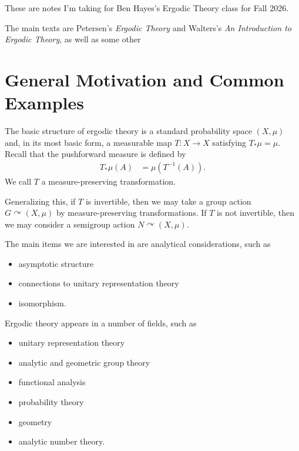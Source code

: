 \documentclass[10pt]{mypackage}
\begin{document}
\RaggedRight
These are notes I'm taking for Ben Hayes's Ergodic Theory class for Fall 2026.

The main texts are Petersen's \textit{Ergodic Theory} and Walters's \textit{An Introduction to Ergodic Theory}, as well as some other 
\section{General Motivation and Common Examples}%
The basic structure of ergodic theory is a standard probability space $\left( X,\mu \right)$ and, in its most basic form, a measurable map $T\colon X\rightarrow X$ satisfying $T_{\ast}\mu = \mu$. Recall that the pushforward measure is defined by
\begin{align*}
  T_{\ast}\mu\left( A \right) &= \mu\left( T^{-1}(A) \right).
\end{align*}
We call $T$ a measure-preserving transformation.

Generalizing this, if $T$ is invertible, then we may take a group action $G\curvearrowright \left( X,\mu \right)$ by measure-preserving transformations. If $T$ is not invertible, then we may consider a semigroup action $N\curvearrowright \left( X,\mu \right)$.

The main items we are interested in are analytical considerations, such as
\begin{itemize}
  \item asymptotic structure
  \item connections to unitary representation theory
  \item isomorphism.
\end{itemize}
Ergodic theory appears in a number of fields, such as
\begin{itemize}
  \item unitary representation theory
  \item analytic and geometric group theory
  \item functional analysis
  \item probability theory
  \item geometry
  \item analytic number theory.
\end{itemize}
\end{document}
